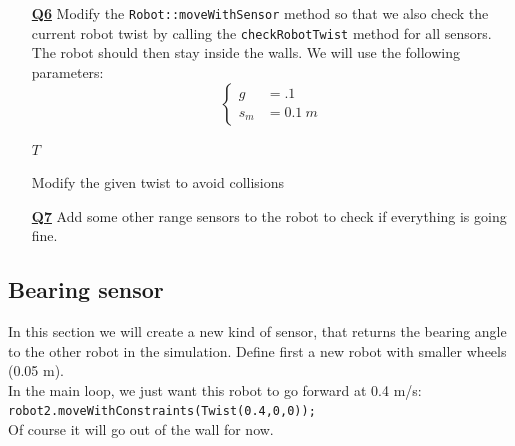 \documentclass{ecnreport}
\begin{document}
\begin{itemize}
\medskip\item[\textbf{\underline{Q6}}] Modify the \texttt{Robot::moveWithSensor} method so that we also check the current robot twist by calling the \texttt{checkRobotTwist} method for all sensors. The robot should then stay inside the walls. We will use the following parameters:
\begin{equation*}
\left\{\begin{array}{ll}
g &= .1 \\
s_m &= 0.1~ m
\end{array}\right.
\end{equation*}

\begin{algorithm}[!h]
{}
\Return $T$
\caption{Modify the given twist to avoid collisions}
\label{algo:range}
\end{algorithm}
\medskip\item[\textbf{\underline{Q7}}] Add some other range sensors to the robot to check if everything is going fine.
\end{itemize}



\newpage

\subsection{Bearing sensor}

In this section we will create a new kind of sensor, that returns the bearing angle to the other robot in the simulation.
Define first a new robot with smaller wheels (0.05 m). \\
In the main loop, we just want this robot to go forward at 0.4 m/s: \\\texttt{robot2.moveWithConstraints(Twist(0.4,0,0));}\\
Of course it will go out of the wall for now.
\end{document}

